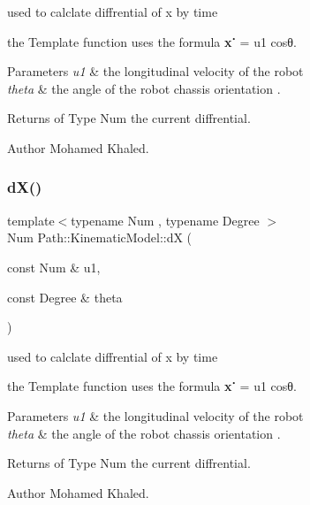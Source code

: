 used to calclate diffrential of x by time 

the Template function uses the formula {\bfseries x˙} = u1 cosθ. 
\begin{DoxyParams}{Parameters}
{\em u1} & the longitudinal velocity of the robot \\
\hline
{\em theta} & the angle of the robot chassis orientation . \\
\hline
\end{DoxyParams}
\begin{DoxyReturn}{Returns}
of Type Num the current diffrential. 
\end{DoxyReturn}
\begin{DoxyAuthor}{Author}
Mohamed Khaled. 
\end{DoxyAuthor}
\mbox{\label{namespace_path_1_1_kinematic_model_a2018f294ab353da7bbbe5dd332a40988}} 
\subsubsection{\texorpdfstring{d\+X()}{dX()}\hspace{0.1cm}{\footnotesize\ttfamily [2/2]}}
{\footnotesize\ttfamily template$<$typename Num , typename Degree $>$ \\
Num Path\+::\+Kinematic\+Model\+::dX (\begin{DoxyParamCaption}\item[{const Num \&}]{u1,  }\item[{const Degree \&}]{theta }\end{DoxyParamCaption})}



used to calclate diffrential of x by time 

the Template function uses the formula {\bfseries x˙} = u1 cosθ. 
\begin{DoxyParams}{Parameters}
{\em u1} & the longitudinal velocity of the robot \\
\hline
{\em theta} & the angle of the robot chassis orientation . \\
\hline
\end{DoxyParams}
\begin{DoxyReturn}{Returns}
of Type Num the current diffrential. 
\end{DoxyReturn}
\begin{DoxyAuthor}{Author}
Mohamed Khaled. 
\end{DoxyAuthor}
\mbox{\label{namespace_path_1_1_kinematic_model_ace9021a98d588b74e2f4ea47f2025828}} 
